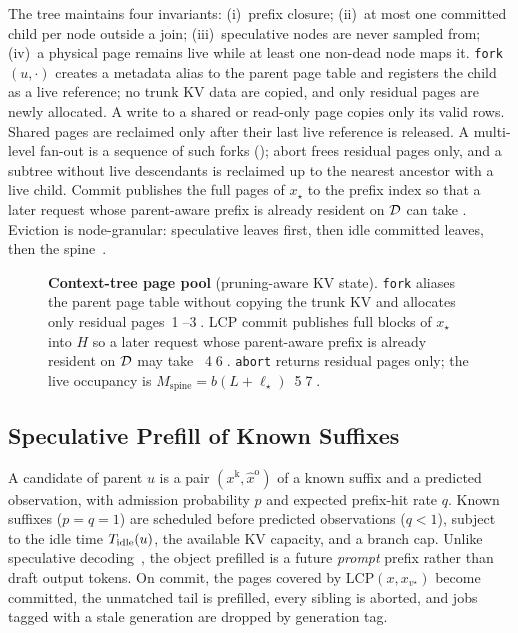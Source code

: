 The tree maintains four invariants: (i)~prefix closure; (ii)~at most one committed child per node outside a join; (iii)~speculative nodes are never sampled from; (iv)~a physical page remains live while at least one non-dead node maps it.
\texttt{fork}$(u,\cdot)$ creates a metadata alias to the parent page table and registers the child as a live reference; no trunk KV data are copied, and only residual pages are newly allocated.
A write to a shared or read-only page copies only its valid rows.
Shared pages are reclaimed only after their last live reference is released.
A multi-level fan-out is a sequence of such forks (); abort frees residual pages only, and a subtree without live descendants is reclaimed up to the nearest ancestor with a live child.
Commit publishes the full pages of $x_\star$ to the prefix index so that a later request whose parent-aware prefix is already resident on $\mathcal{D}$ can take \Hit.
Eviction is node-granular: speculative leaves first, then idle committed leaves, then the spine~\cite{continuum,mori}.

\begin{figure}[t]
\centering
\resizebox{\textwidth}{!}{}
\caption{\textbf{Context-tree page pool} (pruning-aware KV state).
\texttt{fork} aliases the parent page table without copying the trunk KV and allocates only residual pages~\textcircled{1}--\textcircled{3}.
LCP commit publishes full blocks of $x_\star$ into $H$ so a later request whose parent-aware prefix is already resident on $\mathcal{D}$ may take \Hit~\textcircled{4}\textcircled{6}.
\texttt{abort} returns residual pages only; the live occupancy is $M_{\mathrm{spine}}{=}b(L{+}\ell_\star)$~\textcircled{5}\textcircled{7}.}
\label{fig:pool}
\end{figure}

\subsection{Speculative Prefill of Known Suffixes}
\label{sec:speculate}
A candidate of parent $u$ is a pair $(x^{\mathrm{k}},\hat{x}^{\mathrm{o}})$ of a known suffix and a predicted observation, with admission probability $p$ and expected prefix-hit rate $q$.
Known suffixes ($p{=}q{=}1$) are scheduled before predicted observations ($q{<}1$), subject to the idle time $T_{\mathrm{idle}}(u)$, the available KV capacity, and a branch cap.
Unlike speculative decoding~\cite{speculative,medusa}, the object prefilled is a future \emph{prompt} prefix rather than draft output tokens.
On commit, the pages covered by $\mathrm{LCP}(x,x_{v^\star})$ become committed, the unmatched tail is prefilled, every sibling is aborted, and jobs tagged with a stale generation are dropped by generation tag.

